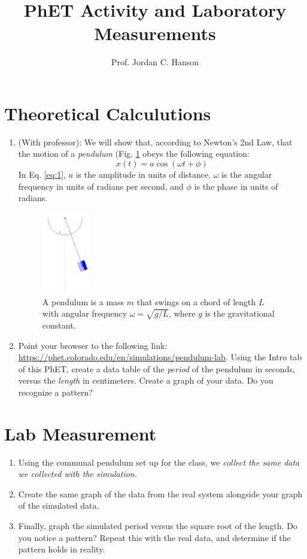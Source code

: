 \documentclass{article}
\begin{document}
\title{PhET Activity and Laboratory Measurements}
\author{Prof. Jordan C. Hanson}

\maketitle

\section{Theoretical Calculutions}

\begin{enumerate}
\item (With professor): We will show that, according to Newton's 2nd Law, that the motion of a \textit{pendulum} (Fig. \ref{fig:pendulum} obeys the following equation:
\begin{equation}
x(t) = a\cos(\omega t + \phi) \label{eq:1}
\end{equation} 
In Eq. \ref{eq:1}, $a$ is the amplitude in units of distance, $\omega$ is the angular frequency in units of radians per second, and $\phi$ is the phase in units of radians.
\begin{figure}[ht]
\centering
\includegraphics[width=0.2\textwidth]{pendulum.png}
\caption{\label{fig:pendulum} A pendulum is a mass $m$ that swings on a chord of length $L$ with angular frequency $\omega = \sqrt{g/L}$, where $g$ is the gravitational constant.}
\end{figure}
\item Point your browser to the following link: \url{https://phet.colorado.edu/en/simulations/pendulum-lab}.  Using the Intro tab of this PhET, create a data table of the \textit{period} of the pendulum in seconds, versus the \textit{length} in centimeters.  Create a graph of your data.  Do you recognize a pattern?
\end{enumerate}

\section{Lab Measurement}

\begin{enumerate}
\item Using the communal pendulum set up for the class, we \textit{collect the same data we collected with the simulation.}
\item Create the same graph of the data from the real system alongside your graph of the simulated data.
\item Finally, graph the simulated period versus the square root of the length.  Do you notice a pattern?  Repeat this with the real data, and determine if the pattern holds in reality.
\end{enumerate}
\end{document}

